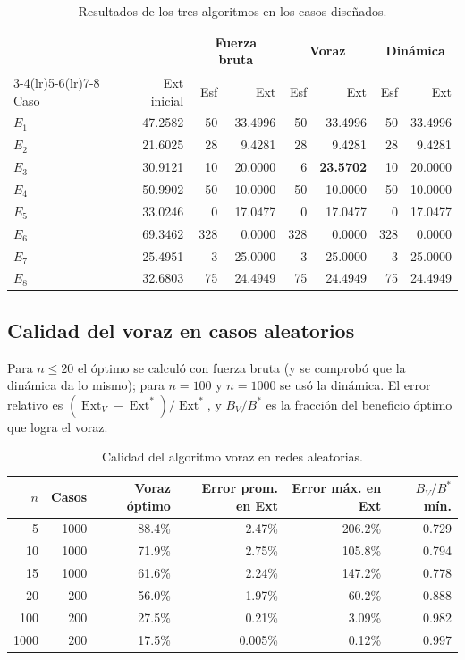 \documentclass[11pt,letterpaper]{article}
\newcommand{\Ext}{\operatorname{Ext}}
\begin{document}
\begin{table}[h]
\centering
\small
\begin{tabular}{lrrrrrrr}
\toprule
 & & \multicolumn{2}{c}{Fuerza bruta} & \multicolumn{2}{c}{Voraz} & \multicolumn{2}{c}{Dinámica} \\
\cmidrule(lr){3-4}\cmidrule(lr){5-6}\cmidrule(lr){7-8}
Caso & Ext inicial & Esf & Ext & Esf & Ext & Esf & Ext \\
\midrule
$E_1$ & 47.2582 & 50  & 33.4996 & 50  & 33.4996 & 50  & 33.4996 \\
$E_2$ & 21.6025 & 28  & 9.4281  & 28  & 9.4281  & 28  & 9.4281 \\
$E_3$ & 30.9121 & 10  & 20.0000 & 6   & \textbf{23.5702} & 10 & 20.0000 \\
$E_4$ & 50.9902 & 50  & 10.0000 & 50  & 10.0000 & 50  & 10.0000 \\
$E_5$ & 33.0246 & 0   & 17.0477 & 0   & 17.0477 & 0   & 17.0477 \\
$E_6$ & 69.3462 & 328 & 0.0000  & 328 & 0.0000  & 328 & 0.0000 \\
$E_7$ & 25.4951 & 3   & 25.0000 & 3   & 25.0000 & 3   & 25.0000 \\
$E_8$ & 32.6803 & 75  & 24.4949 & 75  & 24.4949 & 75  & 24.4949 \\
\bottomrule
\end{tabular}
\caption{Resultados de los tres algoritmos en los casos diseñados.}
\label{tab:comparacion}
\end{table}

\subsection{Calidad del voraz en casos aleatorios}

Para $n \le 20$ el óptimo se calculó con fuerza bruta (y se comprobó que la
dinámica da lo mismo); para $n = 100$ y $n = 1000$ se usó la dinámica. El
error relativo es $(\Ext_V - \Ext^*)/\Ext^*$, y $B_V/B^*$ es la fracción del
beneficio óptimo que logra el voraz.

\begin{table}[h]
\centering
\begin{tabular}{rrrrrr}
\toprule
$n$ & Casos & Voraz óptimo & Error prom. en Ext & Error máx. en Ext & $B_V/B^*$ mín. \\
\midrule
5    & 1000 & 88.4\% & 2.47\%  & 206.2\% & 0.729 \\
10   & 1000 & 71.9\% & 2.75\%  & 105.8\% & 0.794 \\
15   & 1000 & 61.6\% & 2.24\%  & 147.2\% & 0.778 \\
20   & 200  & 56.0\% & 1.97\%  & 60.2\%  & 0.888 \\
100  & 200  & 27.5\% & 0.21\%  & 3.09\%  & 0.982 \\
1000 & 200  & 17.5\% & 0.005\% & 0.12\%  & 0.997 \\
\bottomrule
\end{tabular}
\caption{Calidad del algoritmo voraz en redes aleatorias.}
\label{tab:aleatorio}
\end{table}
\end{document}
